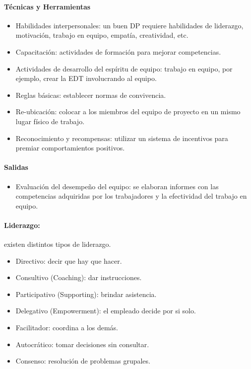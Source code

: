 \documentclass[a4paper,twosides]{article}
\newlength{\wideitemsep}
\let\olditem\item
\renewcommand{\item}{\setlength{\itemsep}{\wideitemsep}\olditem}
\begin{document}
\paragraph{Técnicas y Herramientas}
\begin{itemize}
\item Habilidades interpersonales: un buen DP requiere habilidades de liderazgo, motivación, trabajo en equipo, empatía, creatividad, etc.
\item Capacitación: actividades de formación para mejorar competencias.
\item Actividades de desarrollo del espíritu de equipo: trabajo en equipo, por ejemplo, crear la EDT involucrando al equipo.
\item Reglas básicas: establecer normas de convivencia.
\item Re-ubicación: colocar a los miembros del equipo de proyecto en un mismo lugar físico de trabajo.
\item Reconocimiento y recompensas: utilizar un sistema de incentivos para premiar comportamientos positivos.
\end{itemize}

\paragraph{Salidas}
\begin{itemize}
\item Evaluación del desempeño del equipo: se elaboran informes con las competencias adquiridas por los trabajadores y la efectividad del trabajo en equipo.
\end{itemize}

\paragraph{Liderazgo:} existen distintos tipos de liderazgo.
\begin{itemize}
\item Directivo: decir que hay que hacer.
\item Consultivo (Coaching): dar instrucciones.
\item Participativo (Supporting): brindar asistencia.
\item Delegativo (Empowerment): el empleado decide por si solo.
\item Facilitador: coordina a los demás.
\item Autocrático: tomar decisiones sin consultar.
\item Consenso: resolución de problemas grupales.
\end{itemize}
\end{document}
